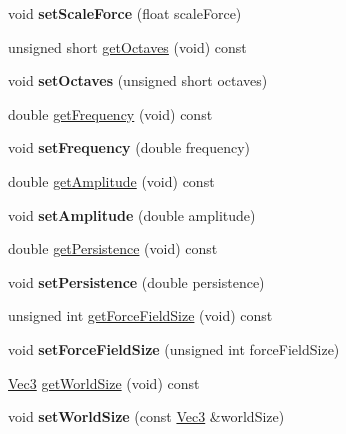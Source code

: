 \begin{DoxyCompactItemize}
void {\bfseries set\+Scale\+Force} (float scale\+Force)
\item 
unsigned short \hyperlink{classPUForceFieldAffector_a874e63dfc3673058b6c5a8ad111f6260}{get\+Octaves} (void) const
\item 
\mbox{\label{classPUForceFieldAffector_afbd77a5d6dfff4a119cb0dae3d57d9c3}} 
void {\bfseries set\+Octaves} (unsigned short octaves)
\item 
double \hyperlink{classPUForceFieldAffector_adc1d9ef5cbe2329ecf1a89757134631a}{get\+Frequency} (void) const
\item 
\mbox{\label{classPUForceFieldAffector_a025c1c7dacdca2c7475cf96cdef388c2}} 
void {\bfseries set\+Frequency} (double frequency)
\item 
double \hyperlink{classPUForceFieldAffector_afa886069dc011c0a6d360f93e55c0f7c}{get\+Amplitude} (void) const
\item 
\mbox{\label{classPUForceFieldAffector_a267a08c9345d49a10306513451ef23b5}} 
void {\bfseries set\+Amplitude} (double amplitude)
\item 
double \hyperlink{classPUForceFieldAffector_a48bbf6a6a218e95b0ffe72a04e029c0f}{get\+Persistence} (void) const
\item 
\mbox{\label{classPUForceFieldAffector_a51a93728ef1098cdb671771b98eeacaa}} 
void {\bfseries set\+Persistence} (double persistence)
\item 
unsigned int \hyperlink{classPUForceFieldAffector_a2881115258d19390c08cc9f497d0eba4}{get\+Force\+Field\+Size} (void) const
\item 
\mbox{\label{classPUForceFieldAffector_a7996df6e166f012029950b46899bbcf0}} 
void {\bfseries set\+Force\+Field\+Size} (unsigned int force\+Field\+Size)
\item 
\hyperlink{classVec3}{Vec3} \hyperlink{classPUForceFieldAffector_a18fdf0379566ff0add7fca6287a930c3}{get\+World\+Size} (void) const
\item 
\mbox{\label{classPUForceFieldAffector_a46716d2924a298446c1fe78780c69145}} 
void {\bfseries set\+World\+Size} (const \hyperlink{classVec3}{Vec3} \&world\+Size)
\item 

\end{DoxyCompactItemize}
